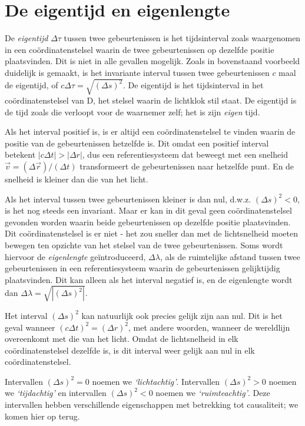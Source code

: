 \section{De eigentijd en eigenlengte}
De {\sl eigentijd} $\Delta \tau$ tussen twee gebeurtenissen is het
tijdsinterval zoals waargenomen in een co\"ordinatenstelsel waarin de
twee gebeurtenissen op dezelfde positie plaatsvinden. Dit is niet in
alle gevallen mogelijk.  Zoals in bovenstaand voorbeeld duidelijk is
gemaakt, is het invariante interval tussen twee gebeurtenissen $c$
maal de eigentijd, of $c\Delta \tau = \sqrt{(\Delta s)^2}$. De
eigentijd is het tijdsinterval in het co\"ordinatenstelsel van D, het
stelsel waarin de lichtklok stil staat. De eigentijd is de tijd zoals
die verloopt voor de waarnemer zelf; het is zijn {\it eigen} tijd.


 Als het interval positief is, is er altijd een co\"ordinatenstelsel te
vinden waarin de positie van de gebeurtenissen hetzelfde is. Dit omdat
een positief interval betekent $|c \Delta t | > | \Delta r|$, dus een
referentiesysteem dat beweegt met een snelheid $\vec{v}=(\Delta
\vec{r})/(\Delta t)$ transformeert  de gebeurtenissen naar hetzelfde punt. En 
de  snelheid is kleiner dan die van het licht. 

Als het interval tussen twee gebeurtenissen kleiner is dan nul, d.w.z.
$(\Delta s)^2 < 0$, is het nog steeds een invariant. Maar er kan in dit
geval geen co\"ordinatenstelsel gevonden worden waarin beide
gebeurtenissen op dezelfde positie plaatsvinden. Dit
co\"ordinatenstelsel is er niet - het zou sneller dan met de lichtsnelheid
moeten bewegen ten opzichte van het stelsel van de twee
gebeurtenissen. Soms wordt hiervoor de {\it eigenlengte} ge\"introduceerd, $\Delta \lambda$, als
de ruimtelijke afstand tussen twee gebeurtenissen in een referentiesysteem waarin de gebeurtenissen
gelijktijdig plaatsvinden. Dit kan alleen als het interval negatief is, en de eigenlengte wordt
dan $\Delta \lambda = \sqrt{|(\Delta s)^2|}$. 

Het interval $(\Delta s)^2$ kan natuurlijk ook precies gelijk zijn
aan nul. Dit is het geval wanneer $(c \Delta t)^2 = (\Delta r)^2$,
met andere woorden, wanneer de wereldlijn overeenkomt met die van het
licht. Omdat de lichtsnelheid in elk co\"ordinatenstelsel dezelfde is,
is dit interval weer gelijk aan nul in elk co\"ordinatenstelsel.

Intervallen $(\Delta s)^2=0$ noemen we {\sl `lichtachtig'}. Intervallen $(\Delta s)^2>0$ noemen we {\sl `tijdachtig'} en
intervallen $(\Delta s)^2< 0$ noemen we {\sl `ruimteachtig'}. Deze intervallen hebben verschillende eigenschappen
met betrekking tot causaliteit; we komen hier op terug.



